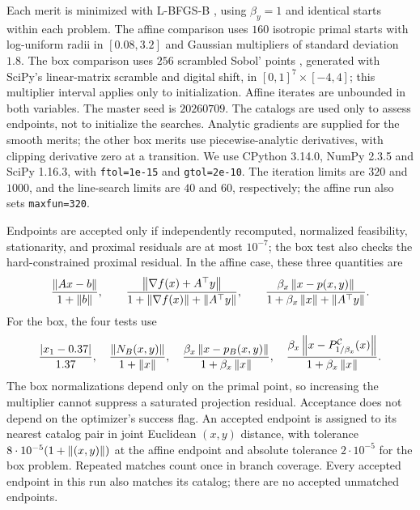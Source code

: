 Each merit is minimized with L-BFGS-B
\citep{ByrdLuNocedalZhu1995,VirtanenEtAl2020}, using \(\beta_y=1\) and
identical starts within each problem.  The affine comparison uses \(160\)
isotropic primal starts with log-uniform radii in \([0.08,3.2]\) and
Gaussian multipliers of standard deviation \(1.8\).  The box comparison
uses \(256\) scrambled Sobol' points \citep{Owen1998}, generated with
SciPy's linear-matrix scramble and digital shift, in
\([0,1]^7\times[-4,4]\); this multiplier interval applies only to
initialization.  Affine iterates are unbounded in both variables.
The master seed is \(20260709\).  The catalogs are used only to assess endpoints,
not to initialize the searches.  Analytic gradients are supplied for the
smooth merits; the other box merits use piecewise-analytic derivatives,
with clipping derivative zero at a transition.  We use CPython 3.14.0,
NumPy 2.3.5 and SciPy 1.16.3, with \texttt{ftol=1e-15} and
\texttt{gtol=2e-10}.  The iteration limits are \(320\) and \(1000\), and
the line-search limits are \(40\) and \(60\), respectively; the affine
run also sets \texttt{maxfun=320}.

Endpoints are accepted only if independently recomputed, normalized
feasibility, stationarity, and proximal residuals are at most \(10^{-7}\);
the box test also checks the hard-constrained proximal residual.  In the
affine case, these three quantities are
\begin{equation}
  \frac{\left\lVert Ax-b\right\rVert}{1+\left\lVert b\right\rVert},\qquad
  \frac{\left\lVert \nabla f(x)+A^\top y\right\rVert}{1+\left\lVert \nabla f(x)\right\rVert+\left\lVert A^\top y\right\rVert},
  \qquad
  \frac{\beta_x\left\lVert x-p(x,y)\right\rVert}{1+\beta_x\left\lVert x\right\rVert+\left\lVert A^\top y\right\rVert}.
  \label{eq:affine-audit-residuals}
\end{equation}
For the box, the four tests use
\begin{equation}
  \frac{|x_1-0.37|}{1.37},\quad
  \frac{\left\lVert N_B(x,y)\right\rVert}{1+\left\lVert x\right\rVert},\quad
  \frac{\beta_x\left\lVert x-p_B(x,y)\right\rVert}{1+\beta_x\left\lVert x\right\rVert},\quad
  \frac{\beta_x\left\lVert x-P_{1/\beta_x}^{\mathcal{C}}(x)\right\rVert}{1+\beta_x\left\lVert x\right\rVert}.
  \label{eq:box-audit-residuals}
\end{equation}
The box normalizations depend only on the primal point, so increasing the
multiplier cannot suppress a saturated projection residual.
Acceptance does not depend on the optimizer's success flag.  An accepted
endpoint is assigned to its nearest catalog pair in joint Euclidean
\((x,y)\) distance, with tolerance
\(8\cdot10^{-5}(1+\left\lVert (x,y)\right\rVert)\) at the affine endpoint and absolute tolerance
\(2\cdot10^{-5}\) for the box problem.  Repeated matches count once in
branch coverage.  Every accepted endpoint in this run also matches its
catalog; there are no accepted unmatched endpoints.

